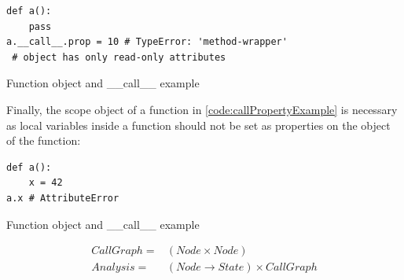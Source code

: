\begin{listing}[H]
	\begin{verbatim}
def a(): 
	pass
a.__call__.prop = 10 # TypeError: 'method-wrapper' 
 # object has only read-only attributes
	\end{verbatim}
\caption{Function object and \_\_call\_\_ example}\label{code:callPropertyExample}
\end{listing}
Finally, the scope object of a function in \ref{code:callPropertyExample} is necessary as local variables inside a function should not be set as properties on the object of the function:
\begin{listing}[H]
	\begin{verbatim}
def a(): 
	x = 42
a.x # AttributeError
	\end{verbatim}
\caption{Function object and \_\_call\_\_ example}\label{code:callPropertyExample}
\end{listing}
\begin{eqnarray*}
CallGraph =& (Node \times Node) \\
Analysis =& (Node \rightarrow State) \times CallGraph
\end{eqnarray*}



